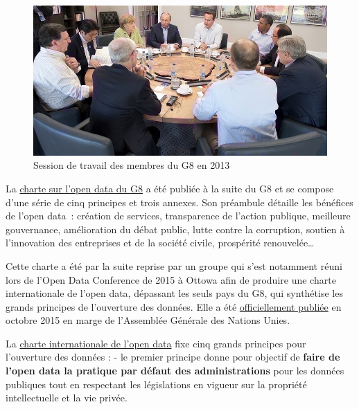 \documentclass[]{book}
\theoremstyle{definition}
\theoremstyle{definition}
\theoremstyle{definition}
\theoremstyle{remark}
\begin{document}
\begin{figure}

{\centering \includegraphics[width=0.6\linewidth]{./img/charte} 

}

\caption{Session de travail des membres du G8 en 2013}\label{fig:unnamed-chunk-5}
\end{figure}

La
\href{https://fr.scribd.com/document/148580461/Charte-du-G8-pour-l-Ouverture-des-Donnees-Publiques-Francais}{charte
sur l'open data du G8} a été publiée à la suite du G8 et se compose
d'une série de cinq principes et trois annexes. Son préambule détaille
les bénéfices de l'open data~: création de services, transparence de
l'action publique, meilleure gouvernance, amélioration du débat public,
lutte contre la corruption, soutien à l'innovation des entreprises et de
la société civile, prospérité renouvelée\ldots{}

Cette charte a été par la suite reprise par un groupe qui s'est
notamment réuni lors de l'Open Data Conference de 2015 à Ottowa afin de
produire une charte internationale de l'open data, dépassant les seuls
pays du G8, qui synthétise les grands principes de l'ouverture des
données. Elle a été
\href{https://opendatacharter.net/seventeen-governments-adopt-the-new-international-open-data-charter/}{officiellement
publiée} en octobre 2015 en marge de l'Assemblée Générale des Nations
Unies.

La \href{https://opendatacharter.net/principles-fr/}{charte
internationale de l'open data} fixe cinq grands principes pour
l'ouverture des données : - le premier principe donne pour objectif de
\textbf{faire de l'open data la pratique par défaut des administrations}
pour les données publiques tout en respectant les législations en
vigueur sur la propriété intellectuelle et la vie privée.
\end{document}
